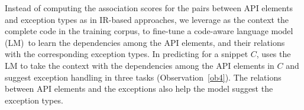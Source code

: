Instead of computing the association scores for the pairs between API
elements and exception types as in IR-based approaches, we leverage as
the context the complete code in the training corpus, to fine-tune a
code-aware language model (LM)~to learn the dependencies among the API
elements, and their relations with the corresponding exception types.
%
In predicting for a snippet $C$, {\tool} uses the LM to take the
context with the dependencies among the API elements in $C$ and suggest
exception handling in three tasks (Observation~\ref{ob4}). The
relations between API elements and the exceptions also help the model
suggest the exception types.




